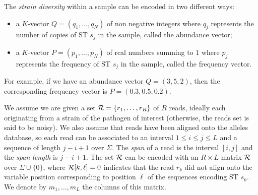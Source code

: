 \documentclass[10pt]{llncs}
\begin{document}

The \textit{strain diversity} within a sample can be encoded in two different ways:
\begin{itemize}
\item a $K$-vector $Q=(q_1,\dots,q_N)$ of non negative integers where $q_j$ represents the number of copies of ST $s_j$ in the sample, called the abundance vector;
\item a $K$-vector $P=(p_1,\dots,p_N)$ of real numbers summing to $1$ where $p_j$ represents the frequency of ST $s_j$ in the sample, called the frequency vector.
\end{itemize}
For example, if we have an abundance vector $Q=(3,5,2)$, then the corresponding frequency vector is $P=(0.3,0.5,0.2)$.

We assume we are given a set ${\cal R}=\{r_1,\dots,r_R\}$ of $R$ reads, ideally each originating from a strain of the pathogen of interest (otherwise, the reads set is said to be noisy). We also assume that reads have been aligned onto the alleles database, so each read can be associated to an interval $1 \leq i \leq j \leq L$ and a sequence of length $j-i+1$ over $\Sigma$.  
The \textit{span} of a read is the interval $[i,j]$ and the \textit{span length} is $j-i+1$. 
The set $\cal R$ can be encoded with an $R \times L$ matrix $\cal R$ over $\Sigma \cup \{0\}$, where ${\cal R}[k,\ell]=0$ indicates that the read $r_k$ did not align onto the variable position corresponding to position $\ell$ of the sequences encoding ST $s_k$. We denote by $m_1,\dots, m_L$ the columns of this matrix.
\end{document}
